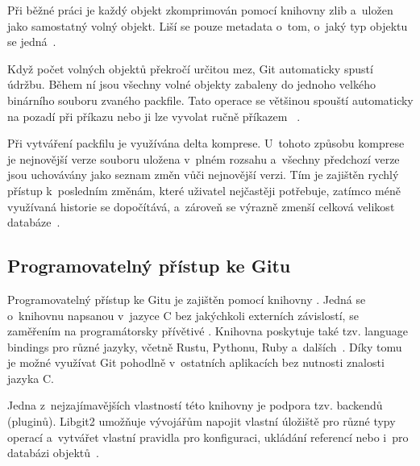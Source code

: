 Při běžné práci je každý objekt zkomprimován pomocí knihovny zlib a~uložen jako samostatný volný objekt. Liší se pouze metadata o~tom, o~jaký typ objektu se jedná~\cite{chacon2014progit}.

Když počet volných objektů překročí určitou mez, Git automaticky spustí údržbu. Během ní jsou všechny volné objekty zabaleny do jednoho velkého binárního souboru zvaného packfile. Tato operace se většinou spouští automaticky na pozadí při příkazu  nebo ji lze vyvolat ručně příkazem ~\cite{chacon2014progit}.

Při vytváření packfilu je využívána delta komprese. U~tohoto způsobu komprese je nejnovější verze souboru uložena v~plném rozsahu a~všechny předchozí verze jsou uchovávány jako seznam změn vůči nejnovější verzi. Tím je zajištěn rychlý přístup k~posledním změnám, které uživatel nejčastěji potřebuje, zatímco méně využívaná historie se dopočítává, a~zároveň se výrazně zmenší celková velikost databáze~\cite{chacon2014progit}.


\subsection{Programovatelný přístup ke Gitu}
\label{sec:git_api}
Programovatelný přístup ke Gitu je zajištěn pomocí knihovny . Jedná se o~knihovnu napsanou v~jazyce C bez jakýchkoli externích závislostí, se zaměřením na programátorsky přívětivé \API{}.
Knihovna poskytuje také tzv. language bindings pro různé jazyky, včetně Rustu, Pythonu, Ruby a~dalších~. Díky tomu je možné využívat Git pohodlně v~ostatních aplikacích bez nutnosti znalosti jazyka C.

Jedna z~nejzajímavějších vlastností této knihovny je podpora tzv. backendů (pluginů). Libgit2 umožňuje vývojářům napojit vlastní úložiště pro různé typy operací a~vytvářet vlastní pravidla pro konfiguraci, ukládání referencí nebo i~pro databázi objektů~.


\endinput